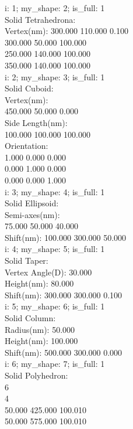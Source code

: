 i: 1; my\_shape:  2; is\_full:   1\\
  Solid Tetrahedrona:\\
Vertex(nm):    300.000    110.000      0.100\\
               300.000     50.000    100.000\\
               250.000    140.000    100.000\\
               350.000    140.000    100.000\\
i: 2; my\_shape:  3; is\_full:   1\\
  Solid Cuboid:\\
     Vertex(nm): \\
    450.000     50.000      0.000 \\
Side Length(nm): \\
    100.000    100.000    100.000 \\
    Orientation: \\
      1.000      0.000      0.000 \\
      0.000      1.000      0.000 \\
      0.000      0.000      1.000 \\
i: 3; my\_shape:  4; is\_full:   1\\
  Solid Ellipsoid:\\
    Semi-axes(nm): \\
      75.000   50.000   40.000\\
    Shift(nm):  100.000  300.000   50.000\\
i: 4; my\_shape:  5; is\_full:   1\\
  Solid Taper:\\
    Vertex Angle(D):   30.000\\
         Height(nm):   80.000\\
    Shift(nm):  300.000  300.000    0.100\\
i: 5; my\_shape:  6; is\_full:   1\\
  Solid Column:\\
    Radius(nm):   50.000\\
    Height(nm):  100.000\\
    Shift(nm):  500.000  300.000    0.000\\
i: 6; my\_shape:  7; is\_full:   1\\
  Solid Polyhedron:\\
  6\\
   4\\
  50.000  425.000  100.010\\
  50.000  575.000  100.010\\

